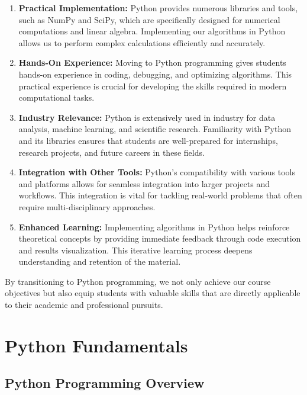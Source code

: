 \documentclass[
  letterpaper,
  DIV=11,
  numbers=noendperiod]{scrreprt}
\theoremstyle{plain}
\theoremstyle{definition}
\theoremstyle{remark}
\begin{document}
\begin{enumerate}
\def\labelenumi{\arabic{enumi}.}
\item
  \textbf{Practical Implementation:} Python provides numerous libraries
  and tools, such as NumPy and SciPy, which are specifically designed
  for numerical computations and linear algebra. Implementing our
  algorithms in Python allows us to perform complex calculations
  efficiently and accurately.
\item
  \textbf{Hands-On Experience:} Moving to Python programming gives
  students hands-on experience in coding, debugging, and optimizing
  algorithms. This practical experience is crucial for developing the
  skills required in modern computational tasks.
\item
  \textbf{Industry Relevance:} Python is extensively used in industry
  for data analysis, machine learning, and scientific research.
  Familiarity with Python and its libraries ensures that students are
  well-prepared for internships, research projects, and future careers
  in these fields.
\item
  \textbf{Integration with Other Tools:} Python's compatibility with
  various tools and platforms allows for seamless integration into
  larger projects and workflows. This integration is vital for tackling
  real-world problems that often require multi-disciplinary approaches.
\item
  \textbf{Enhanced Learning:} Implementing algorithms in Python helps
  reinforce theoretical concepts by providing immediate feedback through
  code execution and results visualization. This iterative learning
  process deepens understanding and retention of the material.
\end{enumerate}

By transitioning to Python programming, we not only achieve our course
objectives but also equip students with valuable skills that are
directly applicable to their academic and professional pursuits.

\section{Python Fundamentals}\label{python-fundamentals}

\subsection{Python Programming
Overview}\label{python-programming-overview}
\end{document}
